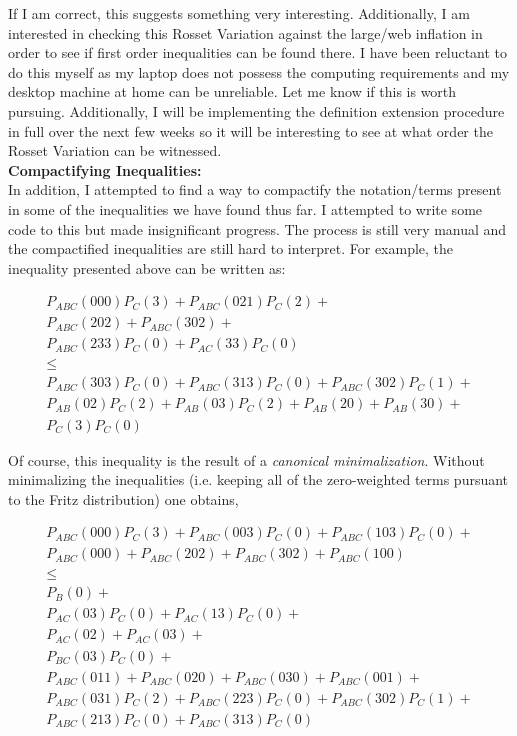 \documentclass[12pt]{article}
\begin{document}
    If I am correct, this suggests something very interesting. Additionally, I am interested in checking this Rosset Variation against the large/web inflation in order to see if first order inequalities can be found there. I have been reluctant to do this myself as my laptop does not possess the computing requirements and my desktop machine at home can be unreliable. Let me know if this is worth pursuing. Additionally, I will be implementing the definition extension procedure in full over the next few weeks so it will be interesting to see at what order the Rosset Variation can be witnessed. \\

    \textbf{Compactifying Inequalities:}\\

    In addition, I attempted to find a way to compactify the notation/terms present in some of the inequalities we have found thus far. I attempted to write some code to this but made insignificant progress. The process is still very manual and the compactified inequalities are still hard to interpret. For example, the inequality presented above can be written as:

    \begin{gather*}
        P_{ABC}(000)P_{C}(3) + P_{ABC}(021)P_{C}(2) + \\
        P_{ABC}(202) + P_{ABC}(302) + \\
        P_{ABC}(233)P_{C}(0) + P_{AC}(33)P_{C}(0) \\
        \leq \\ P_{ABC}(303)P_{C}(0) + P_{ABC}(313)P_{C}(0) + P_{ABC}(302)P_{C}(1) + \\
        P_{AB}(02)P_{C}(2) + P_{AB}(03)P_{C}(2) + P_{AB}(20) + P_{AB}(30) + \\
        P_{C}(3)P_{C}(0)
    \end{gather*}

    Of course, this inequality is the result of a \textit{canonical minimalization}. Without minimalizing the inequalities (i.e. keeping all of the zero-weighted terms pursuant to the Fritz distribution) one obtains,

    \begin{gather*}
        P_{ABC}(000)P_{C}(3) + P_{ABC}(003)P_{C}(0) + P_{ABC}(103)P_{C}(0) + \\
        P_{ABC}(000) + P_{ABC}(202) + P_{ABC}(302) + P_{ABC}(100) \\
        \leq \\
        P_{B}(0) + \\
        P_{AC}(03)P_{C}(0) + P_{AC}(13)P_{C}(0) + \\
        P_{AC}(02) + P_{AC}(03) + \\
        P_{BC}(03)P_{C}(0) + \\
        P_{ABC}(011) + P_{ABC}(020) + P_{ABC}(030) + P_{ABC}(001) + \\
        P_{ABC}(031)P_{C}(2) + P_{ABC}(223)P_{C}(0) + P_{ABC}(302)P_{C}(1) + \\
        P_{ABC}(213)P_{C}(0) + P_{ABC}(313)P_{C}(0)
    \end{gather*}
\end{document}
